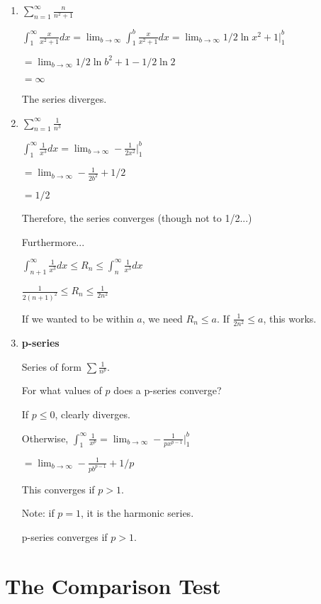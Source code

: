 \documentclass{article}
\begin{document}
\begin{enumerate}
    \item $\sum_{n=1}^{\infty} \frac{n}{n^2+1}$
    
    $\int_1^{\infty} \frac{x}{x^2+1} dx = \lim_{b\to\infty} \int_1^b\frac{x}{x^2+1} dx = \lim_{b\to\infty} 1/2 \ln{x^2+1} |_1^b$
    
    
    $=\lim_{b\to\infty} 1/2\ln{b^2+1} - 1/2\ln{2}$
    
    $=\infty$
    
    The series diverges.
    
    \item $\sum_{n=1}^{\infty} \frac{1}{n^3}$
    
    $\int_1^{\infty} \frac{1}{x^3} dx = \lim_{b\to\infty} -\frac{1}{2x^2} |_1^b$
    
    $=\lim_{b\to\infty} -\frac{1}{2b^2}+1/2$
    
    $ = 1/2$
    
    Therefore, the series converges (though not to 1/2...)
    
    Furthermore...
    
    $\int_{n+1}^\infty \frac{1}{x^3} dx \leq R_n \leq \int_{n}^\infty \frac{1}{x^3} dx$
    
    $\frac{1}{2(n+1)^2} \leq R_n \leq \frac{1}{2n^2}$
    
    If we wanted to be within $a$, we need $R_n \leq a$. If $\frac{1}{2n^2}\leq a$, this works.
    
    \item \textbf{p-series}
    
    Series of form $\sum \frac{1}{n^p}$.
    
    For what values of $p$ does a p-series converge?
    
    If $p\leq0$, clearly diverges.
    
    Otherwise, $\int_1^\infty \frac{1}{x^p} = \lim_{b\to\infty} -\frac{1}{px^{p-1}} |_1^b$
    
    $ = \lim_{b\to\infty} -\frac{1}{pb^{p-1}} + 1/p$
    
    This converges if $p>1$. 
    
    Note: if $p=1$, it is the harmonic series. 
    
    p-series converges if $p>1$.
    
\end{enumerate}


\section{The Comparison Test}
\end{document}
